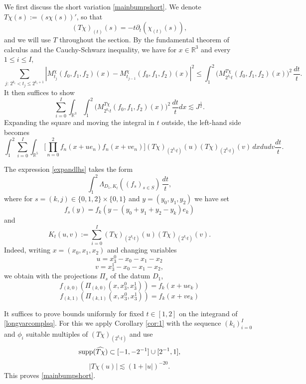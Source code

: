 \documentclass[12pt,reqno]{amsart}
\theoremstyle{plain}
\theoremstyle{definition}
\numberwithin{equation}{section}
\newcommand{\R}{{\mathbb R}}
\begin{document}
We first discuss the short variation \eqref{mainbumpshort}. 
 We denote $T\chi(s):= (s\chi(s))'$, so that   
 \[(T\chi)_{(t)}(s)=-t\partial_t (\chi_{(t)}(s)),\]
and  we will use $T$ throughout the section.
By the fundamental theorem of calculus and the Cauchy-Schwarz inequality, we have for
 $x\in \R^3$
and every $1\leq i \leq I$, 
\[  \sum_{j:\,2^{k_i}< t_j\le 2^{k_i+1}} |M^{\chi}_{t_j}(f_0,f_1,f_2)(x)-M^{\chi}_{t_{j-1}}(f_0,f_1,f_2)(x)|^2 \leq   \int_{1}^2 \big( M_{2^{k_i}t}^{T\chi}(f_0,f_1,f_2)(x)\big)^2 \,\frac{dt}{t}  . \]
It then suffices to show
\begin{equation*}
      \sum_{i=0}^I\int_{\mathbb{R}^3} \int_{1}^2 \big( M_{2^{k_i}t}^{T\chi}(f_0,f_1,f_2)(x) \big)^2\, \frac{dt}{t} dx \lesssim J^{\frac 12}.
\end{equation*}
Expanding the square and moving the integral in $t$ outside,   the left-hand side   becomes
\begin{equation}\label{expandlhs}
\int_1^2\sum_{i=0}^I  \int_{\mathbb{R}^5} \Big[\prod_{n=0}^2 f_n(x+ue_n) 
f_n(x+ve_n) \Big] (T\chi)_{(2^{k_i}t)} (u) (T\chi)_{(2^{k_i}t)} (v) 
  \,dx du dv  \frac{dt}{t}.
\end{equation}
 

The expression \eqref{expandlhs} takes the form  
\begin{equation}
    \label{longvarcomplsq}
    \int_1^2 \Lambda_{D_1,{K_t}}((f_s)_{s\in S})\, \frac{dt}{t},
\end{equation}
where for $s=(k,j)\in \{0,1,2\}\times \{0,1\}$  and $y=(y_0,y_1,y_2)$ we have set
\begin{equation}\label{E:f}
{f}_{s}(y)=f_k(y-(y_0+y_1+y_2-y_k)e_k )
\end{equation}
and 
\begin{equation}\label{ktuv}
K_t(u,v) := \sum_{i=0}^I (T\chi)_{(2^{k_i}t)}(u) (T\chi)_{(2^{k_i}t)}(v).
\end{equation}
Indeed, writing $x=(x_0,x_1,x_2)$ and changing variables
\begin{equation}\label{E:change1}
u=x_3^0-x_0-x_1-x_2
\end{equation}
\begin{equation}\label{E:change2}
v=x_3^1-x_0-x_1-x_2,
\end{equation}
we obtain with the projections $\Pi_s$ of the datum $D_1$, 
\[{f}_{(k,0)}(\Pi_{(k,0)}(x,x_3^0, x_3^1))=f_k(x+ue_k)\]
\[{f}_{(k,1)}(\Pi_{(k,1)}(x,x_3^0, x_3^1))=f_k(x+ve_k)\]
 


It suffices to prove bounds uniformly for fixed $t\in [1,2]$ on the integrand of \eqref{longvarcomplsq}.
For this we apply Corollary \ref{cor:1}  with 
the sequence $(k_i)_{i=0}^I$ and $\phi_i$ suitable multiples of $(T\chi)_{(2^{k_i}t)}$ and use
\begin{equation}\label{psisupp}
    {\rm supp}(\widehat{T\chi})\subset    [-1,-2^{-1}]\cup[2^{-1},1] ,
\end{equation}
\begin{equation}
    \label{psidecay}
    |T\chi (u)| \lesssim  (1+|u|)^{-20}.
\end{equation}
This proves \eqref{mainbumpshort}.  
\end{document}
